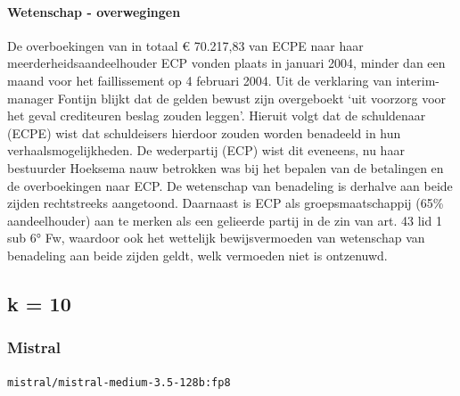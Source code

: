 \documentclass[
  dutch,
  a4paper,
]{article}
\begin{document}
\paragraph{Wetenschap - overwegingen}\label{wetenschap---overwegingen-50}

De overboekingen van in totaal € 70.217,83 van ECPE naar haar meerderheidsaandeelhouder ECP vonden plaats in januari 2004, minder dan een maand voor het faillissement op 4 februari 2004. Uit de verklaring van interim-manager Fontijn blijkt dat de gelden bewust zijn overgeboekt `uit voorzorg voor het geval crediteuren beslag zouden leggen'. Hieruit volgt dat de schuldenaar (ECPE) wist dat schuldeisers hierdoor zouden worden benadeeld in hun verhaalsmogelijkheden. De wederpartij (ECP) wist dit eveneens, nu haar bestuurder Hoeksema nauw betrokken was bij het bepalen van de betalingen en de overboekingen naar ECP. De wetenschap van benadeling is derhalve aan beide zijden rechtstreeks aangetoond. Daarnaast is ECP als groepsmaatschappij (65\% aandeelhouder) aan te merken als een gelieerde partij in de zin van art. 43 lid 1 sub 6° Fw, waardoor ook het wettelijk bewijsvermoeden van wetenschap van benadeling aan beide zijden geldt, welk vermoeden niet is ontzenuwd.

\newpage


\subsection{k = 10}\label{k-10-5}

\subsubsection{Mistral}\label{mistral-17}

\texttt{mistral/mistral-medium-3.5-128b:fp8}
\end{document}
